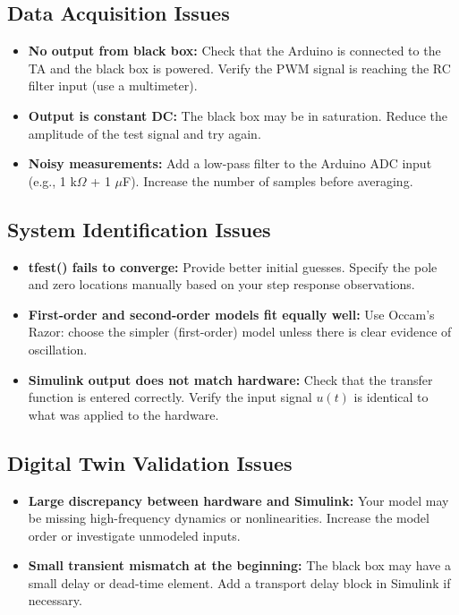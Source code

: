 \documentclass[11pt,letterpaper]{article}
\begin{document}
\subsection{Data Acquisition Issues}

\begin{itemize}
    \item \textbf{No output from black box:} Check that the Arduino is connected to the TA and the black box is powered. Verify the PWM signal is reaching the RC filter input (use a multimeter).
    \item \textbf{Output is constant DC:} The black box may be in saturation. Reduce the amplitude of the test signal and try again.
    \item \textbf{Noisy measurements:} Add a low-pass filter to the Arduino ADC input (e.g., 1 k$\Omega$ + 1 $\mu$F). Increase the number of samples before averaging.
\end{itemize}

\subsection{System Identification Issues}

\begin{itemize}
    \item \textbf{tfest() fails to converge:} Provide better initial guesses. Specify the pole and zero locations manually based on your step response observations.
    \item \textbf{First-order and second-order models fit equally well:} Use Occam's Razor: choose the simpler (first-order) model unless there is clear evidence of oscillation.
    \item \textbf{Simulink output does not match hardware:} Check that the transfer function is entered correctly. Verify the input signal $u(t)$ is identical to what was applied to the hardware.
\end{itemize}

\subsection{Digital Twin Validation Issues}

\begin{itemize}
    \item \textbf{Large discrepancy between hardware and Simulink:} Your model may be missing high-frequency dynamics or nonlinearities. Increase the model order or investigate unmodeled inputs.
    \item \textbf{Small transient mismatch at the beginning:} The black box may have a small delay or dead-time element. Add a transport delay block in Simulink if necessary.
\end{itemize}
\end{document}
